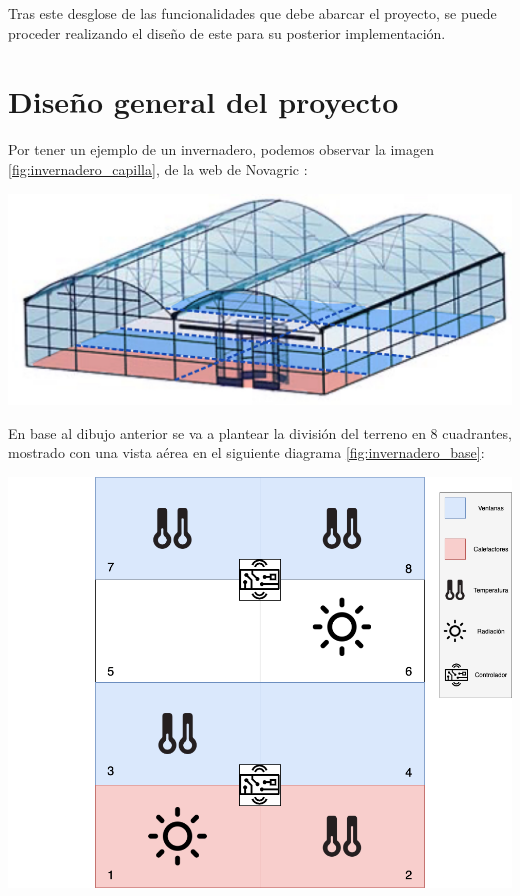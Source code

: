 Tras este desglose de las funcionalidades que debe abarcar el proyecto, se puede proceder realizando el diseño de este para su posterior implementación.

\section{Diseño general del proyecto}

Por tener un ejemplo de un invernadero, podemos observar la imagen \ref{fig:invernadero_capilla}, de la web de Novagric \cite{novagric-invernadero}:

\begin{center}
    \centering
    \includegraphics[width=\textwidth]{img/05-InvernaderoCapilla-Base.jpeg}
    \label{fig:invernadero_capilla}
\end{center}

En base al dibujo anterior se va a plantear la división del terreno en 8 cuadrantes, mostrado con una vista aérea en el siguiente diagrama \ref{fig:invernadero_base}:

\begin{center}
    \centering
    \includegraphics[width=\textwidth]{img/04-Invernadero_base.png}
    \label{fig:invernadero_base}
\end{center}

